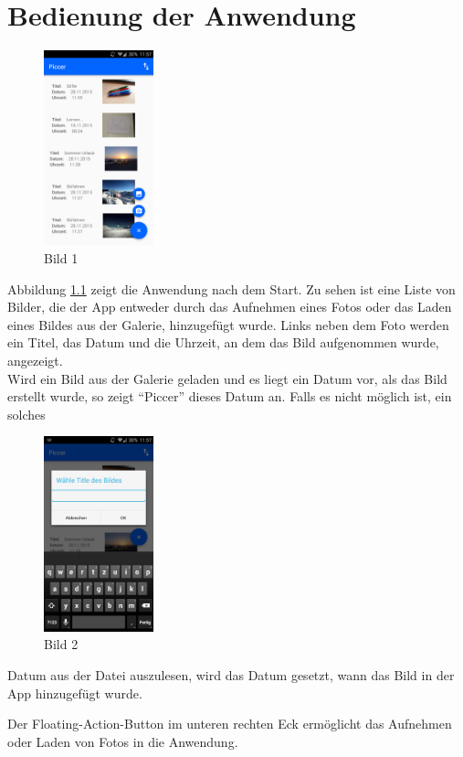 
\chapter{Bedienung der Anwendung}
\begin{figure}
\label{Bild1}
\centering
\includegraphics[width=120px]{../images/bild_1}
\caption{Bild 1}
\end{figure}
Abbildung \ref{Bild1} zeigt die Anwendung nach dem Start. Zu sehen ist eine Liste von Bilder, die der App entweder durch das Aufnehmen eines Fotos oder das Laden eines Bildes
aus der Galerie, hinzugefügt wurde. Links neben dem Foto werden ein Titel, das Datum und die Uhrzeit, an dem das Bild aufgenommen wurde, angezeigt. \\
Wird ein Bild aus der Galerie geladen und es liegt ein Datum vor, als das Bild erstellt wurde, so zeigt \enquote{Piccer} dieses Datum an. Falls es nicht möglich ist, ein solches
\begin{figure}
\label{Bild2}
\centering
\includegraphics[width=120px]{../images/bild_2}
\caption{Bild 2}
\end{figure}
Datum aus der Datei auszulesen, wird das Datum gesetzt, wann das Bild in der App hinzugefügt wurde.


Der Floating-Action-Button im unteren rechten Eck ermöglicht das Aufnehmen oder Laden von Fotos in die Anwendung.

